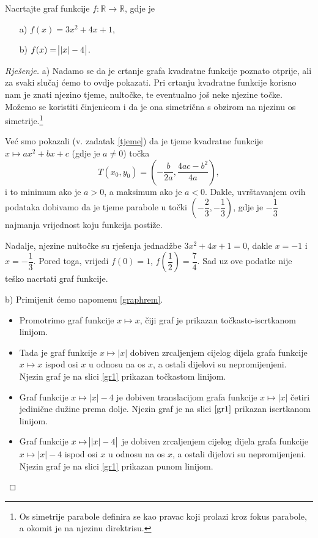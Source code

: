 \begin{exercise}
\label{exgraph1}
Nacrtajte graf funkcije $f: \mathbb{R}\to \mathbb{R}$, gdje je
\begin{itemize}
\item[a)] $f(x)=3x^2+4x+1$, 
\item[b)] $f(x)=\abs{|x|-4}$.
\end{itemize}
\end{exercise}
\begin{proof}[Rješenje] a) Nadamo se da je crtanje grafa kvadratne funkcije poznato otprije, ali za svaki slučaj ćemo to ovdje pokazati. Pri crtanju kvadratne funkcije korisno nam je znati njezino tjeme, nultočke, te eventualno još neke njezine točke. Možemo se koristiti činjenicom i da je ona simetrična s obzirom na njezinu os simetrije.\footnote{Os simetrije parabole definira se kao pravac koji prolazi kroz fokus parabole, a okomit je na njezinu direktrisu.} 

Već smo pokazali (v. zadatak \ref{tjeme}) da je tjeme kvadratne funkcije $x\mapsto ax^2+bx+c$ (gdje je $a\neq 0$) točka
$$T(x_0, y_0)=\left(-\dfrac{b}{2a}, \dfrac{4ac-b^2}{4a}\right),$$
i to minimum ako je $a>0$, a maksimum ako je $a<0$. Dakle, uvrštavanjem ovih podataka dobivamo da je tjeme parabole u točki $\left(-\dfrac{2}{3}, -\dfrac{1}{3}\right)$, gdje je $-\dfrac{1}{3}$ najmanja vrijednost koju funkcija postiže.

Nadalje, njezine nultočke su rješenja jednadžbe $3x^2+4x+1=0$, dakle $x=-1$ i $x=-\dfrac{1}{3}$. Pored toga, vrijedi $f(0)=1$, $f\left(\dfrac{1}{2}\right)=\dfrac{7}{4}$. Sad uz ove podatke nije teško nacrtati graf funkcije.

b) Primijenit ćemo napomenu \ref{graphrem}.
\begin{itemize}
\item Promotrimo graf funkcije $x\mapsto x$, čiji graf je prikazan točkasto-iscrtkanom linijom.
\item Tada je graf funkcije $x\mapsto |x|$ dobiven zrcaljenjem cijelog dijela grafa funkcije $x\mapsto x$ ispod osi $x$ u odnosu na os $x$, a ostali dijelovi su nepromijenjeni. Njezin graf je na slici \ref{gr1} prikazan točkastom linijom.
\item Graf funkcije $x\mapsto |x|-4$ je dobiven translacijom grafa funkcije $x\mapsto |x|$ četiri jedinične dužine prema dolje. Njezin graf je na slici $\ref{gr1}$ prikazan iscrtkanom linijom.
\item Graf funkcije $x\mapsto \abs{|x|-4}$ je dobiven zrcaljenjem cijelog dijela grafa funkcije $x\mapsto |x|-4$ ispod osi $x$ u odnosu na os $x$, a ostali dijelovi su nepromijenjeni. Njezin graf je na slici \ref{gr1} prikazan punom linijom.
\end{itemize}
\end{proof}
